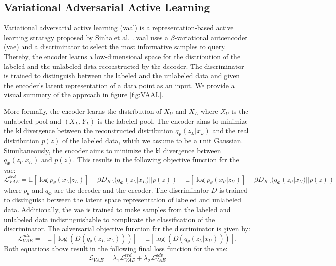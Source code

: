 \subsection{Variational Adversarial Active Learning}
\label{sec:Related_work:Active_Learning:VAAL}
Variational adversarial active learning (\gls{vaal}) is a representation-based active learning strategy proposed by Sinha et al. \cite{sinha2019variational}. 
\gls{vaal} uses a $\beta$-variational autoencoder (\gls{vae}) \cite{higgins2017beta} and a discriminator to select the most informative samples to query.
Thereby, the encoder learns a low-dimensional space for the distribution of the labeled and the unlabeled data reconstructed by the decoder. 
The discriminator is trained to distinguish between the labeled and the unlabeled data and given the encoder's latent representation of a data point as an
input. We provide a visual summary of the approach in figure \ref{fig:VAAL}. \par
More formally, the encoder learns the distribution of $X_U$ and $X_L$ where $X_U$ is the unlabeled pool and $(X_L, Y_L)$ is the labeled pool. The encoder
aims to minimize the \gls{kl} divergence \cite{goldberger2004hierarchical} between the reconstructed distribution $q_\Phi (z_L | x_L)$ and
the real distribution $p(z)$ of the labeled data, which we assume to be a unit Gaussian. Simultaneously, the encoder aims to minimize the \gls{kl} divergence
between $q_\Phi (z_U | x_U)$ and $p(z)$. This results in the following objective function for the \gls{vae}:
\begin{equation}
    \mathcal{L}^{trd}_{VAE} = \mathbb{E}[\log p_\theta (x_L | z_L)] - \beta D_{KL} (q_\Phi (z_L | x_L) || p(z)) + \mathbb{E}[\log p_\theta (x_U | z_U)] - \beta D_{KL} (q_\Phi (z_U | x_U) || p(z))
\end{equation}
where $p_\theta$ and $q_\Phi$ are the decoder and the encoder. The discriminator $D$ is trained to distinguish between the latent space representation
of labeled and unlabeled data. Additionally, the \gls{vae} is trained to make samples from the labeled and
unlabeled data indistinguishable to complicate the classification of the discriminator. The adversarial objective function for the discriminator is given by:
\begin{equation}
    \mathcal{L}^{adv}_{VAE} = - \mathbb{E}[\log(D(q_\theta (z_L | x_L)))] - \mathbb{E}[\log(D(q_\theta(z_U | x_U)))].
\end{equation}
Both equations above result in the following final loss function for the \gls{vae}:
\begin{equation}
    \mathcal{L}_{VAE} = \lambda_1 \mathcal{L}^{trd}_{VAE} + \lambda_2 \mathcal{L}^{adv}_{VAE}
\end{equation}
